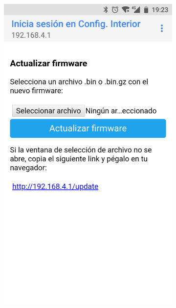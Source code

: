 \begin{figure}
\begin{subfigure}{0.49\columnwidth}
  \centering
  \includegraphics[width=1\columnwidth,frame]{images/interior-firmware-update}
  \caption{}
  \label{fig:interior-firmware-update}
\end{subfigure}
\hfill
\begin{subfigure}{0.49\columnwidth}
  \centering

\end{subfigure}
\end{figure}
